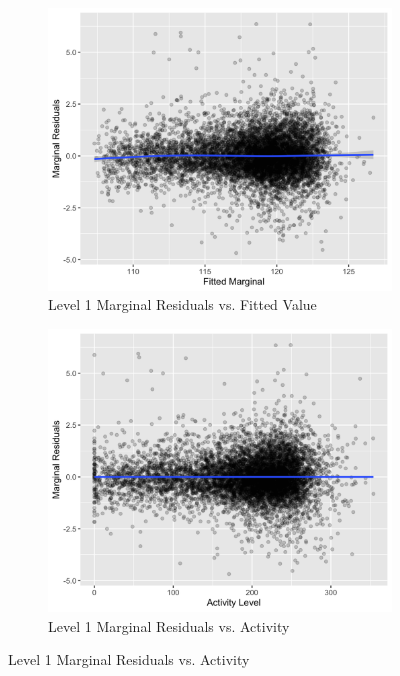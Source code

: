 \documentclass[12pt,twoside,letterpaper]{article}
\theoremstyle{definition}
\theoremstyle{definition}
\begin{document}
\begin{figure}[H] 
\centering
\begin{subfigure}[b]{0.475\textwidth}
\centering
\includegraphics[width=\textwidth]{pics/mar resid fit.png}
\caption[]%
{{\small Level 1 Marginal Residuals vs. Fitted Value}}
\label{fig: mar resid v fit}
\end{subfigure}
\hfill
\begin{subfigure}[b]{0.475\textwidth}
\centering
\includegraphics[width=\textwidth]{pics/mar resid act.png}
\caption[]%
{{\small Level 1 Marginal Residuals vs. Activity}}

\end{subfigure}
\end{figure}
\end{document}
